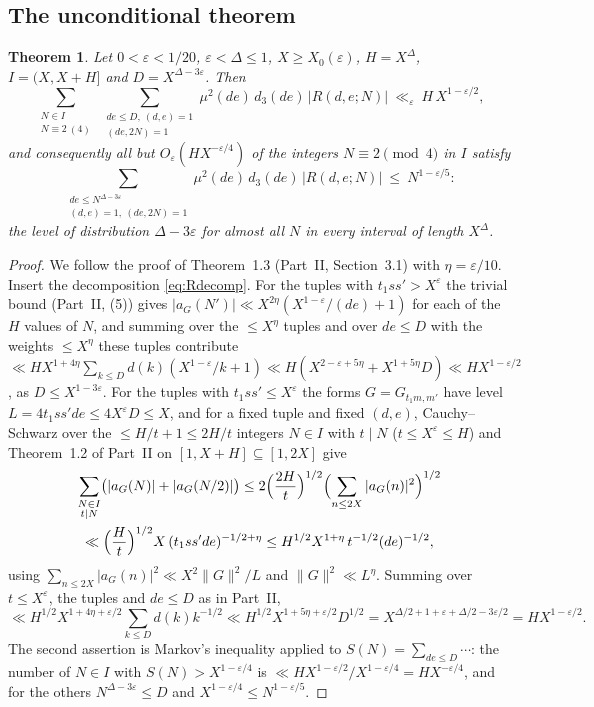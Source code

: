 \documentclass[11pt,a4paper]{article}
\newtheorem{theorem}{Theorem}[section]
\theoremstyle{remark}
\theoremstyle{definition}
\newcommand{\e}{\varepsilon}
\begin{document}
\subsection{The unconditional theorem}
\begin{theorem}\label{thm:short}
Let $0<\e<1/20$, $\e<\Delta\le1$, $X\ge X_0(\e)$, $H=X^\Delta$, $I=(X,X+H]$ and $D=X^{\Delta-3\e}$. Then
\[
\sum_{\substack{N\in I\\ N\equiv2\ (4)}}\ \sum_{\substack{de\le D,\ (d,e)=1\\ (de,2N)=1}}\mu^2(de)\,d_3(de)\,|R(d,e;N)|\ \ll_\e\ H\,X^{1-\e/2},
\]
and consequently all but $O_\e(HX^{-\e/4})$ of the integers $N\equiv2\pmod4$ in $I$ satisfy
\[
\sum_{\substack{de\le N^{\Delta-3\e}\\ (d,e)=1,\ (de,2N)=1}}\mu^2(de)\,d_3(de)\,|R(d,e;N)|\ \le\ N^{1-\e/5}:
\]
the level of distribution $\Delta-3\e$ for almost all $N$ in every interval of length $X^\Delta$.
\end{theorem}
\begin{proof}
We follow the proof of Theorem~1.3 (Part~II, Section~3.1) with $\eta=\e/10$. Insert the decomposition \eqref{eq:Rdecomp}. For the tuples with $t_1ss'>X^\e$ the trivial bound (Part~II, (5)) gives $|a_G(N')|\ll X^{2\eta}(X^{1-\e}/(de)+1)$ for each of the $H$ values of $N$, and summing over the $\le X^\eta$ tuples and over $de\le D$ with the weights $\le X^\eta$ these tuples contribute $\ll HX^{1+4\eta}\sum_{k\le D}d(k)(X^{1-\e}/k+1)\ll H(X^{2-\e+5\eta}+X^{1+5\eta}D)\ll HX^{1-\e/2}$, as $D\le X^{1-3\e}$. For the tuples with $t_1ss'\le X^\e$ the forms $G=G_{t_1m,m'}$ have level $L=4t_1ss'de\le4X^\e D\le X$, and for a fixed tuple and fixed $(d,e)$, Cauchy--Schwarz over the $\le H/t+1\le2H/t$ integers $N\in I$ with $t\mid N$ ($t\le X^\e\le H$) and Theorem~1.2 of Part~II on $[1,X+H]\subseteq[1,2X]$ give
\begin{multline*}
\sum_{\substack{N\in I\\ t\mid N}}\bigl(|a_G(N)|+|a_G(N/2)|\bigr)\le2\Bigl(\frac{2H}t\Bigr)^{1/2}\Bigl(\sum_{n\le2X}|a_G(n)|^2\Bigr)^{1/2}\\
\ll\Bigl(\frac Ht\Bigr)^{1/2}X\,(t_1ss'de)^{-1/2+\eta}\le H^{1/2}X^{1+\eta}\,t^{-1/2}(de)^{-1/2},
\end{multline*}
using $\sum_{n\le2X}|a_G(n)|^2\ll X^2\|G\|^2/L$ and $\|G\|^2\ll L^{\eta}$. Summing over $t\le X^\e$, the tuples and $de\le D$ as in Part~II,
\[
\ll H^{1/2}X^{1+4\eta+\e/2}\sum_{k\le D}d(k)k^{-1/2}\ll H^{1/2}X^{1+5\eta+\e/2}D^{1/2}=X^{\Delta/2+1+\e+\Delta/2-3\e/2}=HX^{1-\e/2}.
\]
The second assertion is Markov's inequality applied to $S(N)=\sum_{de\le D}\cdots$: the number of $N\in I$ with $S(N)>X^{1-\e/4}$ is $\ll HX^{1-\e/2}/X^{1-\e/4}=HX^{-\e/4}$, and for the others $N^{\Delta-3\e}\le D$ and $X^{1-\e/4}\le N^{1-\e/5}$.
\end{proof}
\end{document}
